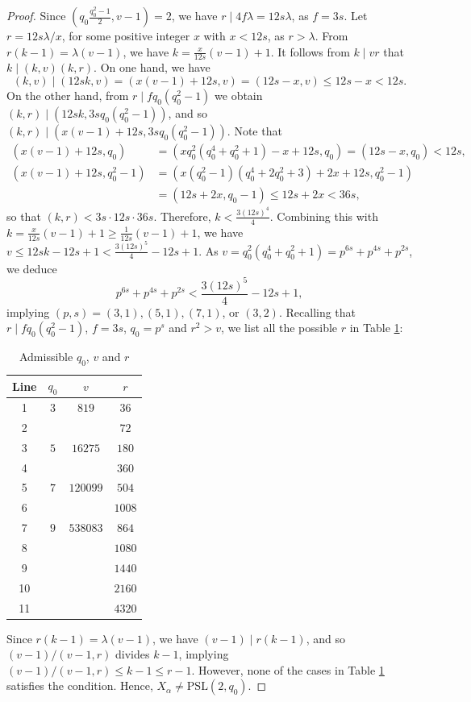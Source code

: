 \documentclass[a4paper,twopage,reqno,12pt]{amsart}
\theoremstyle{definition}
\numberwithin{equation}{section}
\begin{document}
\begin{proof}
Since $\left(q_0\frac{q_0^2-1}{2},v-1\right)=2$,
we have $r\mid 4f\lambda=12s\lambda$, as $f=3s$.
Let $r=12s\lambda/x$,
for some positive integer $x$ with $x<12s$, as $r>\lambda$.
From $r(k-1)=\lambda (v-1)$,  we have $k=\frac{x}{12s}(v-1)+1$.
It follows from $k\mid vr$ that $k\mid (k,v)(k,r)$.
On one hand, we have 
\[
(k,v)\mid (12sk,v)=(x(v-1)+12s,v)=(12s-x,v)\le 12s-x<12s.
\]
On the other hand, from $r\mid fq_0(q_0^2-1)$ we obtain 
$(k,r)\mid (12sk,3sq_0(q_0^2-1))$, and so $(k,r)\mid (x(v-1)+12s,3sq_0(q_0^2-1))$.
Note that 
\begin{align*}
(x(v-1)+12s,q_0)     &=\left(xq_0^2(q_0^4+q_0^2+1)-x+12s,q_0\right)=(12s-x,q_0)<12s,\\
(x(v-1)+12s, q_0^2-1)&=\left(x(q_0^2-1)(q_0^4+2q_0^2+3)+2x+12s,q_0^2-1\right)\\
                     &=(12s+2x,q_0-1)\le 12s+2x<36s,          
\end{align*}
so that $(k,r)<3s\cdot 12s\cdot 36s$.
Therefore, $k<\frac{3(12s)^4}{4}$.
Combining this with $k=\frac{x}{12s}(v-1)+1\ge \frac{1}{12s}(v-1)+1$,
we have $v\le 12sk-12s+1< \frac{3(12s)^5}{4}-12s+1$.
As $v=q_0^2(q_0^4+q_0^2+1) = p^{6s} + p^{4s} + p^{2s}$,
we deduce
\[
p^{6s}+p^{4s}+p^{2s}<\frac{3(12s)^5}{4}-12s+1,
\]
implying $(p,s)=(3,1),(5,1),(7,1)$, or $(3,2)$. Recalling that $r\mid fq_0(q_0^2-1)$, $f=3s$, $q_0=p^s$ and $r^2>v$, %
we list all the possible $r$ in Table \ref{tab:lemma3.3}:
\begin{table}[H]
\tiny
\centering 
\caption{Admissible $q_0$, $v$ and $r$} 
\label{tab:lemma3.3} 
\begin{tabular}{cccc}
\toprule
Line & $q_0$ & $v$ & $r$ \\ 
\midrule 
1 &   $3$&    $819$ &      $36$     \\
2  &     &          &      $72$     \\
3 &   $5$&    $16275$ &      $180$     \\
4 &      &            &     $360$     \\
5 &   $7$&    $120099$ &      $504$    \\
6 &     &            &    $1008$   \\
7 &   $9$&    $538083$ &      $864$    \\
8 &      &             &      $1080$   \\
9&       &             &    $1440$   \\
10&      &           &    $2160 $   \\
11 &     &           &    $4320$  \\
\bottomrule
\end{tabular}
\end{table}
Since $r(k-1)=\lambda(v-1)$,
we have $(v-1)\mid r(k-1)$,
and so $(v-1)/(v-1,r)$ divides $k-1$,
implying $(v-1)/(v-1,r)\le k-1\le r-1$.
However, none of the cases in Table \ref{tab:lemma3.3} satisfies the condition.
Hence, $X_{\alpha}\neq \mathrm{PSL}(2,q_0)$.
\end{proof}
\end{document}
